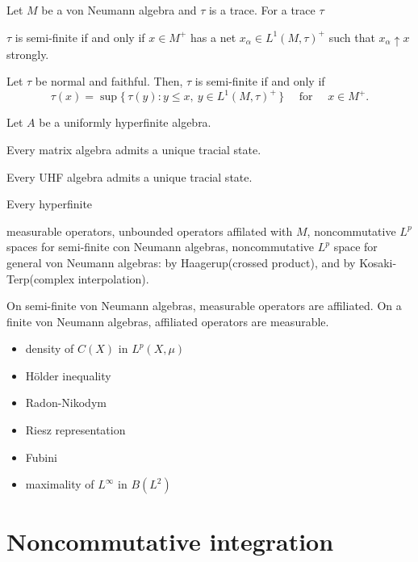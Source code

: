 \documentclass{../../large}
\begin{document}
\begin{prb}
Let $M$ be a von Neumann algebra and $\tau$ is a trace.
For a trace $\tau$
\begin{parts}
\item $\tau$ is semi-finite if and only if $x\in M^+$ has a net $x_\alpha\in L^1(M,\tau)^+$ such that $x_\alpha\uparrow x$ strongly.
\item Let $\tau$ be normal and faithful. Then, $\tau$ is semi-finite if and only if
\[\tau(x)=\sup\{\,\tau(y):y\le x,\ y\in L^1(M,\tau)^+\,\}\quad\text{ for }\quad x\in M^+.\]
\end{parts}
\end{prb}

\begin{prb}
Let $A$ be a uniformly hyperfinite algebra.
\begin{parts}
\item Every matrix algebra admits a unique tracial state.
\item Every UHF algebra admits a unique tracial state.
\item Every hyperfinite 
\end{parts}
\end{prb}


measurable operators,
unbounded operators affilated with $M$,
noncommutative $L^p$ spaces for semi-finite con Neumann algebras,
noncommutative $L^p$ space for general von Neumann algebras: by Haagerup(crossed product), and by Kosaki-Terp(complex interpolation).

On semi-finite von Neumann algebras, measurable operators are affiliated.
On a finite von Neumann algebras, affiliated operators are measurable.


\begin{itemize}
\item density of $C(X)$ in $L^p(X,\mu)$
\item H\"older inequality
\item Radon-Nikodym
\item Riesz representation
\item Fubini
\item maximality of $L^\infty$ in $B(L^2)$
\end{itemize}



\section{Noncommutative integration}
\end{document}
